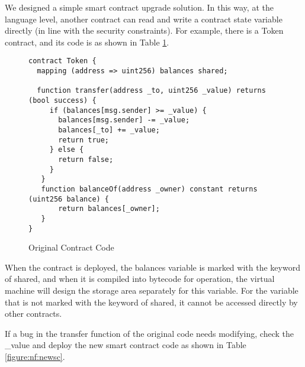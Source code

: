 We designed a simple smart contract upgrade solution. In this way, at the language level, another contract can read and write a contract state variable directly (in line with the security constraints). For example, there is a Token contract, and its code is as shown in Table \ref{figure:nf:oldsc}. \\


	\begin{figure}[!h]
  	\centering
  	\begin{minipage}{0.95\linewidth}
	\begin{lstlisting}[frame=single]
contract Token {
  mapping (address => uint256) balances shared;

  function transfer(address _to, uint256 _value) returns (bool success) {
     if (balances[msg.sender] >= _value) {
       balances[msg.sender] -= _value;
       balances[_to] += _value;
       return true;
     } else {
       return false;
     }
   }
   function balanceOf(address _owner) constant returns (uint256 balance) {
       return balances[_owner];
   }
}
	\end{lstlisting}
  	\end{minipage}
  	\caption{Original Contract Code}
  	\label{figure:nf:oldsc}
	\end{figure}

When the contract is deployed, the balances variable is marked with the keyword of shared, and when it is compiled into bytecode for operation, the virtual machine will design the storage area separately for this variable. For the variable that is not marked with the keyword of shared, it cannot be accessed directly by other contracts.


If a bug in the transfer function of the original code needs modifying, check the \_value and deploy the new smart contract code as shown in Table \ref{figure:nf:newsc}.


